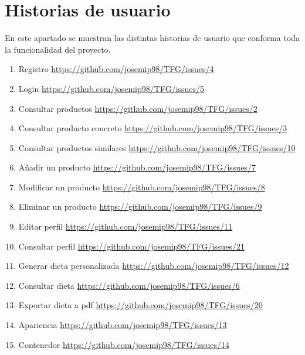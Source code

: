 \chapter{Historias de usuario}

En este apartado se muestran las distintas historias de usuario que conforma toda la funcionalidad del proyecto.

\begin{enumerate}
	\item Registro \url{https://github.com/josemip98/TFG/issues/4}
    \item Login \url{https://github.com/josemip98/TFG/issues/5}
    \item Consultar productos \url{https://github.com/josemip98/TFG/issues/2}
    \item Consultar producto concreto \url{https://github.com/josemip98/TFG/issues/3}
    \item Consultar productos similares \url{https://github.com/josemip98/TFG/issues/10}
    \item Añadir un producto \url{https://github.com/josemip98/TFG/issues/7}
    \item Modificar un producto \url{https://github.com/josemip98/TFG/issues/8}
    \item Eliminar un producto \url{https://github.com/josemip98/TFG/issues/9}
    \item Editar perfil \url{https://github.com/josemip98/TFG/issues/11}
    \item Consultar perfil \url{https://github.com/josemip98/TFG/issues/21}
    \item Generar dieta personalizada \url{https://github.com/josemip98/TFG/issues/12}
    \item Consultar dieta \url{https://github.com/josemip98/TFG/issues/6}
    \item Exportar dieta a pdf \url{https://github.com/josemip98/TFG/issues/20}
    \item Apariencia \url{https://github.com/josemip98/TFG/issues/13}
    \item Contenedor \url{https://github.com/josemip98/TFG/issues/14}
\end{enumerate}

